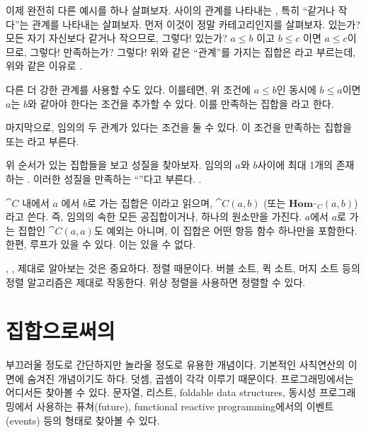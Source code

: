 이제 완전히 다른 예시를 하나 살펴보자.
\trMorphism\이 \trObject 사이의 관계를 나타내는 \trCategory, 특히 ``같거나 작다''는 관계를 나타내는 \trCategory\를 살펴보자.
먼저 이것이 정말 카테고리인지를 살펴보자. 
\trIdentityMorphism\은 있는가? 모든 \trObject\는 자기 자신보다 같거나 작으므로, 그렇다!
\trComposition\은 있는가? $a \leqslant b$ 이고 $b \leqslant c$ 이면 $a \leqslant c$이므로, 그렇다!
\trComposition\은 \trAssociativity\를 만족하는가? 그렇다!
위와 같은 ``관계''를 가지는 집합은 \newterm{\trPreorder}라고 부르는데, 위와 같은 이유로 \trPreorder\는 .

다른 더 강한 관계를 사용할 수도 있다. 이를테면, 위 조건에 $a \leqslant b$인 동시에 $b \leqslant a$이면 $a$는 $b$와 같아야 한다는 조건을 추가할 수 있다.
이를 만족하는 집합을 \newterm{\trPartialOrder}라고 한다.

마지막으로, 임의의 두  관계가 있다는 조건을 둘 수 있다.
이 조건을 만족하는 집합을 \newterm{\trLinearOrder} 또는 \newterm{\trTotalOrder}라고 부른다.

위 순서가 있는 집합들을 \trCategory\로 보고 성질을 찾아보자.
\trPreorder\는 임의의 \trObject $a$와 $b$사이에 최대 1개의 \trMorphism\이 존재하는 .
이러한 성질을 만족하는 \trCategory\를 ``\trThin''다고 부른다. \trPreorder\는 \trThin\은 .


\trCategory  $\cat{C}$ 내에서 \trObject  $a$ 에서 \trObject  $b$로 가는  집합은
\newterm{\trHomSet}이라고 읽으며, $\cat{C}(a, b)$ (또는 $\mathbf{Hom}_{\cat{C}}(a, b)$)라고 쓴다. 
즉, 임의의  속한 모든 \trHomSet\은 공집합이거나, 하나의 원소만을 가진다. 
$a$에서 $a$로 가는  집합인 $\cat{C}(a, a)$도 예외는 아니며, 이 집합은 어떤  항등 함수 하나만을 포함한다.
한편,  루프가 있을 수 있다. 이는  있을 수 없다.

\trPreorder, \trPartialOrder, \trTotalOrder\를 제대로 알아보는 것은 중요하다. 정렬 때문이다.
버블 소트, 퀵 소트, 머지 소트 등의 정렬 알고리즘은  제대로 작동한다.
\trPartialOrder\는 위상 정렬을 사용하면 정렬할 수 있다.

\section{집합으로써의 \trMonoid}

\trMonoid\는 부끄러울 정도로 간단하지만 놀라울 정도로 유용한 개념이다.
기본적인 사칙연산의 이면에 숨겨진 개념이기도 하다. 덧셈, 곱셈이 각각 \trMonoid\를 이루기 때문이다.
\trMonoid\는 프로그래밍에서는 어디서든 찾아볼 수 있다.
문자열, 리스트, foldable data structures, 동시성 프로그래밍에서 사용하는 퓨쳐(future), functional reactive programming에서의 이벤트(events) 
등의 형태로 \trMonoid\를 찾아볼 수 있다.

